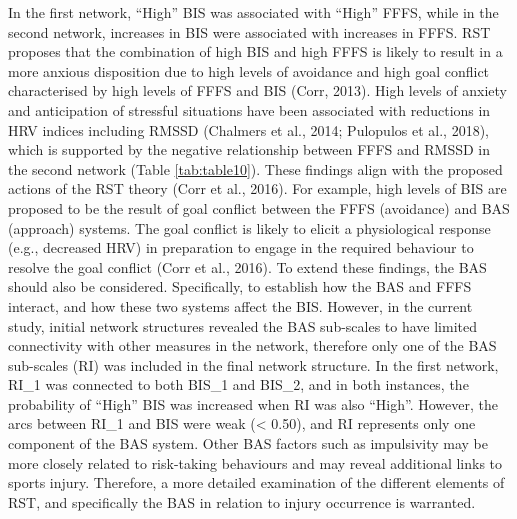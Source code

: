 \documentclass[
  english,
  man]{apa6}
\begin{document}
In the first network, ``High'' BIS was associated with ``High'' FFFS, while in the second network, increases in BIS were associated with increases in FFFS.
RST proposes that the combination of high BIS and high FFFS is likely to result in a more anxious disposition due to high levels of avoidance and high goal conflict characterised by high levels of FFFS and BIS (Corr, 2013).
High levels of anxiety and anticipation of stressful situations have been associated with reductions in HRV indices including RMSSD (Chalmers et al., 2014; Pulopulos et al., 2018), which is supported by the negative relationship between FFFS and RMSSD in the second network (Table \ref{tab:table10}).
These findings align with the proposed actions of the RST theory (Corr et al., 2016).
For example, high levels of BIS are proposed to be the result of goal conflict between the FFFS (avoidance) and BAS (approach) systems.
The goal conflict is likely to elicit a physiological response (e.g., decreased HRV) in preparation to engage in the required behaviour to resolve the goal conflict (Corr et al., 2016).
To extend these findings, the BAS should also be considered.
Specifically, to establish how the BAS and FFFS interact, and how these two systems affect the BIS.
However, in the current study, initial network structures revealed the BAS sub-scales to have limited connectivity with other measures in the network, therefore only one of the BAS sub-scales (RI) was included in the final network structure.
In the first network, RI\_1 was connected to both BIS\_1 and BIS\_2, and in both instances, the probability of ``High'' BIS was increased when RI was also ``High''.
However, the arcs between RI\_1 and BIS were weak (\textless{} 0.50), and RI represents only one component of the BAS system.
Other BAS factors such as impulsivity may be more closely related to risk-taking behaviours and may reveal additional links to sports injury.
Therefore, a more detailed examination of the different elements of RST, and specifically the BAS in relation to injury occurrence is warranted.
\end{document}

